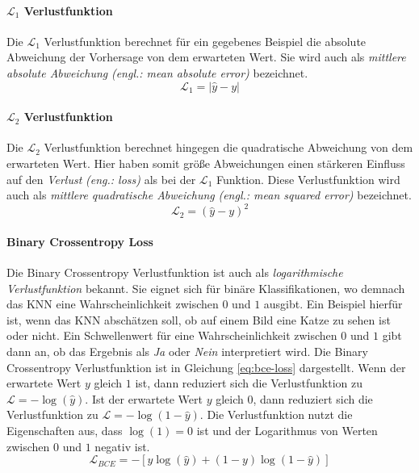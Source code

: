\paragraph{$\mathcal{L}_1$ Verlustfunktion} Die $\mathcal{L}_1$ Verlustfunktion berechnet für ein gegebenes Beispiel die absolute Abweichung der Vorhersage von dem erwarteten Wert. Sie wird auch als \emph{mittlere absolute Abweichung} \emph{(engl.: mean absolute error)} bezeichnet.
\begin{equation}
   \mathcal{L}_1 = |\hat{y} - y|
\end{equation}

\paragraph{$\mathcal{L}_2$ Verlustfunktion} Die $\mathcal{L}_2$ Verlustfunktion berechnet hingegen die quadratische Abweichung von dem erwarteten Wert. Hier haben somit größe Abweichungen einen stärkeren Einfluss auf den \emph{Verlust} \emph{(eng.: loss)} als bei der $\mathcal{L}_1$ Funktion. Diese Verlustfunktion wird auch als \emph{mittlere quadratische Abweichung} \emph{(engl.: mean squared error)} bezeichnet.
\begin{equation}
   \mathcal{L}_2 = (\hat{y} - y)^2
\end{equation}

\paragraph{Binary Crossentropy Loss} Die Binary Crossentropy Verlustfunktion ist auch als \emph{logarithmische Verlustfunktion} bekannt. Sie eignet sich für binäre Klassifikationen, wo demnach das \ac{KNN} eine Wahrscheinlichkeit zwischen $0$ und $1$ ausgibt. Ein Beispiel hierfür ist, wenn das \ac{KNN} abschätzen soll, ob auf einem Bild eine Katze zu sehen ist oder nicht. Ein Schwellenwert für eine Wahrscheinlichkeit zwischen $0$ und $1$ gibt dann an, ob das Ergebnis als \emph{Ja} oder \emph{Nein} interpretiert wird. Die Binary Crossentropy Verlustfunktion ist in Gleichung \ref{eq:bce-loss} dargestellt. Wenn der erwartete Wert $y$ gleich $1$ ist, dann reduziert sich die Verlustfunktion zu $\mathcal{L} = -\log(\hat{y})$. Ist der erwartete Wert $y$ gleich $0$, dann reduziert sich die Verlustfunktion zu $\mathcal{L} = -\log(1 - \hat{y})$. Die Verlustfunktion nutzt die Eigenschaften aus, dass $\log(1) = 0$ ist und der Logarithmus von Werten zwischen $0$ und $1$ negativ ist. \cite{bce-loss}
\begin{equation}
	\label{eq:bce-loss}
   \mathcal{L}_{BCE} =  - [y \log(\hat{y}) + (1 - y) \log(1 - \hat{y})]
\end{equation}

